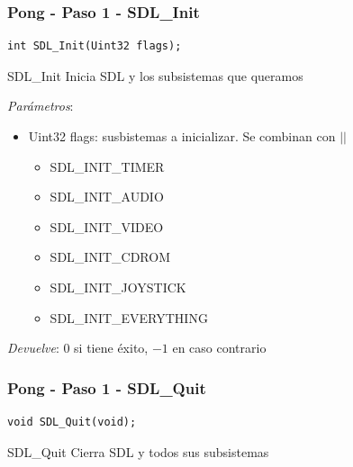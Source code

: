 \begin{frame}[fragile]
    \frametitle{Pong - Paso 1 - SDL\_Init}
	
\begin{verbatim}
int SDL_Init(Uint32 flags);
\end{verbatim}

    \begin{block}{SDL\_Init}
	Inicia SDL y los subsistemas que queramos
	
	\emph{Parámetros}:
	\begin{itemize}
	    \item Uint32 flags: susbistemas a inicializar. Se combinan con $||$
		\begin{itemize}
		    \item SDL\_INIT\_TIMER
		    \item SDL\_INIT\_AUDIO
		    \item SDL\_INIT\_VIDEO
		    \item SDL\_INIT\_CDROM
		    \item SDL\_INIT\_JOYSTICK
		    \item SDL\_INIT\_EVERYTHING
		\end{itemize}
	\end{itemize}
	
	\emph{Devuelve}: $0$ si tiene éxito, $-1$ en caso contrario

    \end{block}

\end{frame}

\begin{frame}[fragile]
    \frametitle{Pong - Paso 1 - SDL\_Quit}
	
\begin{verbatim}
void SDL_Quit(void);
\end{verbatim}

    \begin{block}{SDL\_Quit}
	Cierra SDL y todos sus subsistemas
    \end{block}

\end{frame}

